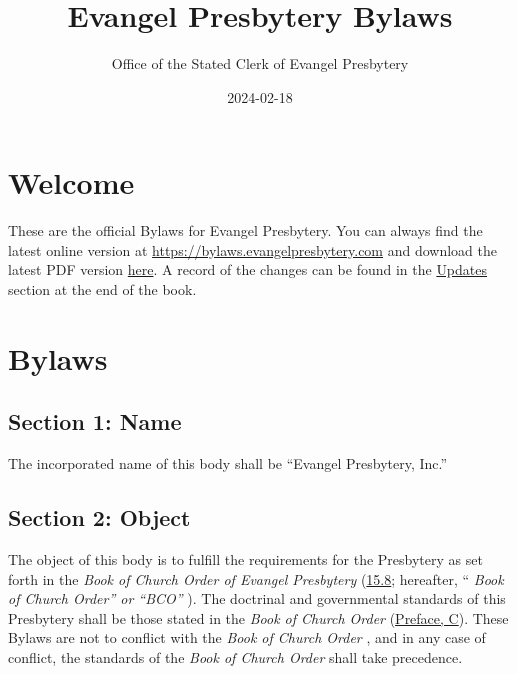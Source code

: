 \documentclass[
]{book}
\title{Evangel Presbytery Bylaws}
\author{Office of the Stated Clerk of Evangel Presbytery}
\date{2024-02-18}
\begin{document}
\maketitle

{
\hypersetup{linkcolor=}
\setcounter{tocdepth}{1}
\tableofcontents
}
\hypertarget{welcome}{%
\chapter*{Welcome}\label{welcome}}

These are the official Bylaws for Evangel Presbytery. You can always find the latest online version at \url{https://bylaws.evangelpresbytery.com} and download the latest PDF version \href{https://bylaws.evangelpresbytery.com/evangel-presbytery-bylaws.pdf}{here}. A record of the changes can be found in the \href{https://bylaws.evangelpresbytery.com/updates.html}{Updates} section at the end of the book.

\mainmatter

\hypertarget{bylaws}{%
\chapter*{Bylaws}\label{bylaws}}

\hypertarget{section-1-name}{%
\section*{Section 1: Name}\label{section-1-name}}

The incorporated name of this body shall be ``Evangel Presbytery, Inc.''

\hypertarget{section-2-object}{%
\section*{Section 2: Object}\label{section-2-object}}

The object of this body is to fulfill the requirements for the Presbytery as set forth in the \emph{Book of Church Order of Evangel Presbytery} (\href{https://bco.evangelpresbytery.com/form-of-government.html\#the-presbytery}{15.8}; hereafter, `` \emph{Book of Church Order'' or ``BCO''} ). The doctrinal and governmental standards of this Presbytery shall be those stated in the \emph{Book of Church Order} (\href{https://bco.evangelpresbytery.com/preface.html}{Preface, C}). These Bylaws are not to conflict with the \emph{Book of Church Order} , and in any case of conflict, the standards of the \emph{Book of Church Order} shall take precedence.
\end{document}
